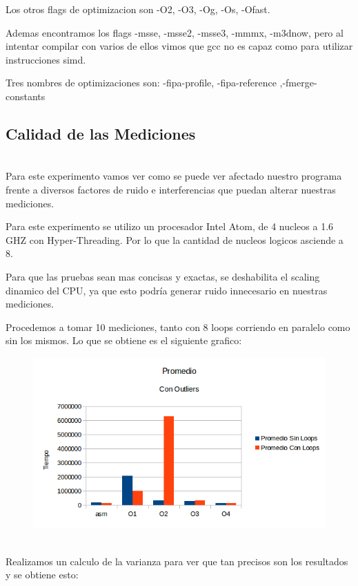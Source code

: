 \documentclass[a4paper]{article}
\begin{document}
Los otros flags de optimizacion son -O2, -O3, -Og, -Os, -Ofast.

Ademas encontramos los flags -msse, -msse2, -msse3, -mmmx, -m3dnow, pero al intentar compilar con varios de ellos vimos que gcc no es capaz como para utilizar instrucciones simd.

Tres nombres de optimizaciones son: -fipa-profile, -fipa-reference ,-fmerge-constants 

\newpage
\subsection{Calidad de las Mediciones}
\\
Para este experimento vamos ver como se puede ver afectado nuestro programa frente a diversos factores de ruido e interferencias que puedan alterar nuestras mediciones.

Para este experimento se utilizo un procesador Intel Atom, de 4 nucleos a 1.6 GHZ con Hyper-Threading. Por lo que la cantidad de nucleos logicos asciende a 8.

Para que las pruebas sean mas concisas y exactas, se deshabilita el scaling dinamico del CPU, ya que esto podría generar ruido innecesario en nuestras mediciones.

Procedemos a tomar 10 mediciones, tanto con 8 loops corriendo en paralelo como sin los mismos. Lo que se obtiene es el siguiente grafico:
\\
\begin{figure}[h!]
  \begin{center}
	\includegraphics[scale=0.66]{GraficosTesting/crop/PCO.png}
	\label{fig1}
  \end{center}
\end{figure}
\\
Realizamos un calculo de la varianza para ver que tan precisos son los resultados y se obtiene esto:
\end{document}
